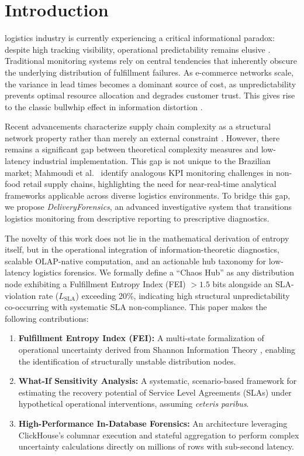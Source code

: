 \documentclass[conference]{IEEEtran}
\begin{document}
\section{Introduction}
 logistics industry is currently experiencing a critical informational paradox: despite high tracking visibility, operational predictability remains elusive \cite{chopra2016supply}. Traditional monitoring systems rely on central tendencies that inherently obscure the underlying distribution of fulfillment failures. As e-commerce networks scale, the variance in lead times becomes a dominant source of cost, as unpredictability prevents optimal resource allocation and degrades customer trust. This gives rise to the classic bullwhip effect in information distortion \cite{lee1997bullwhip}.

Recent advancements characterize supply chain complexity as a structural network property rather than merely an external constraint \cite{wang2016bullwhip}. However, there remains a significant gap between theoretical complexity measures and low-latency industrial implementation. This gap is not unique to the Brazilian market; Mahmoudi et al.\ \cite{mahmoudi2026real} identify analogous KPI monitoring challenges in non-food retail supply chains, highlighting the need for near-real-time analytical frameworks applicable across diverse logistics environments. To bridge this gap, we propose \textit{DeliveryForensics}, an advanced investigative system that transitions logistics monitoring from descriptive reporting to prescriptive diagnostics. 

The novelty of this work does not lie in the mathematical derivation of entropy itself, but in the operational integration of information-theoretic diagnostics, scalable OLAP-native computation, and an actionable hub taxonomy for low-latency logistics forensics. We formally define a ``Chaos Hub'' as any distribution node exhibiting a Fulfillment Entropy Index (FEI) $> 1.5$ bits alongside an SLA-violation rate ($L_{\text{SLA}}$) exceeding 20\%, indicating high structural unpredictability co-occurring with systematic SLA non-compliance. This paper makes the following contributions:
\begin{enumerate}
    \item \textbf{Fulfillment Entropy Index (FEI):} A multi-state formalization of operational uncertainty derived from Shannon Information Theory \cite{shannon1948mathematical}, enabling the identification of structurally unstable distribution nodes.
    \item \textbf{What-If Sensitivity Analysis:} A systematic, scenario-based framework for estimating the recovery potential of Service Level Agreements (SLAs) under hypothetical operational interventions, assuming \textit{ceteris paribus}.
    \item \textbf{High-Performance In-Database Forensics:} An architecture leveraging ClickHouse's columnar execution and stateful aggregation \cite{abadi2012design, schulze2024clickhouse} to perform complex uncertainty calculations directly on millions of rows with sub-second latency.
\end{enumerate}
\end{document}
